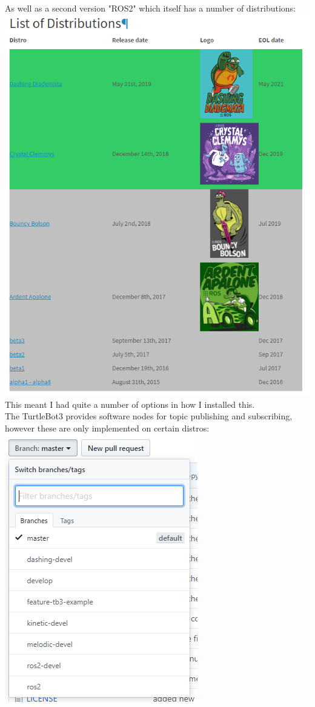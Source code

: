 \documentclass[10pt,a4paper]{report}
\begin{document}
			As well as a second version "ROS2" which itself has a number of distributions: \\
			\includegraphics[scale=0.5]{ROS2Distro}\cite{ros2_distros} \\
			This meant I had quite a number of options in how I installed this. \\
			The TurtleBot3 provides software nodes for topic publishing and subscribing, however these are only implemented on certain distros: \\
			\includegraphics[scale=0.75]{TurtleBot3SupportedDistributions} \\
\end{document}
